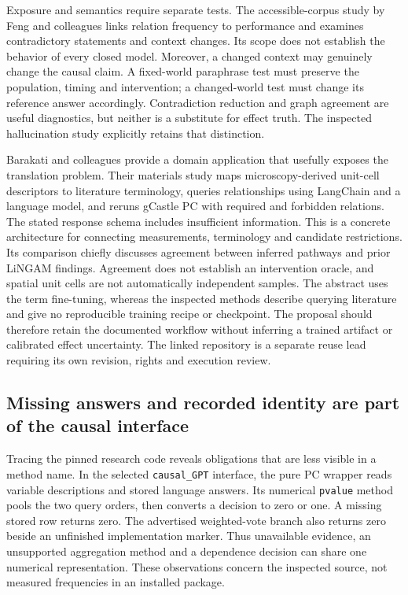 Exposure and semantics require separate tests. The accessible-corpus
study by Feng and colleagues links relation frequency to performance and
examines contradictory statements and context changes. Its scope does
not establish the behavior of every closed model. Moreover, a changed
context may genuinely change the causal claim. A fixed-world paraphrase
test must preserve the population, timing and intervention; a
changed-world test must change its reference answer accordingly.
\citep{v12_la_2407_19638} Contradiction reduction and graph agreement
are useful diagnostics, but neither is a substitute for effect truth.
The inspected hallucination study explicitly retains that distinction.
\citep{exec13_hallucination}

Barakati and colleagues provide a domain application that usefully
exposes the translation problem. Their materials study maps
microscopy-derived unit-cell descriptors to literature terminology,
queries relationships using LangChain and a language model, and reruns
gCastle PC with required and forbidden relations. The stated response
schema includes insufficient information. This is a concrete
architecture for connecting measurements, terminology and candidate
restrictions. Its comparison chiefly discusses agreement between
inferred pathways and prior LiNGAM findings. Agreement does not
establish an intervention oracle, and spatial unit cells are not
automatically independent samples. The abstract uses the term
fine-tuning, whereas the inspected methods describe querying literature
and give no reproducible training recipe or checkpoint. The proposal
should therefore retain the documented workflow without inferring a
trained artifact or calibrated effect uncertainty. The linked repository
is a separate reuse lead requiring its own revision, rights and
execution review. \citep{exec14_iid_materials}

\hypertarget{missing-answers-and-recorded-identity-are-part-of-the-causal-interface}{%
\subsection{Missing answers and recorded identity are part of the causal
interface}\label{missing-answers-and-recorded-identity-are-part-of-the-causal-interface}}

Tracing the pinned research code reveals obligations that are less
visible in a method name. In the selected \texttt{causal\_GPT}
interface, the pure PC wrapper reads variable descriptions and stored
language answers. Its numerical \texttt{pvalue} method pools the two
query orders, then converts a decision to zero or one. A missing stored
row returns zero. The advertised weighted-vote branch also returns zero
beside an unfinished implementation marker. Thus unavailable evidence,
an unsupported aggregation method and a dependence decision can share
one numerical representation. These observations concern the inspected
source, not measured frequencies in an installed package.
\citep{exec14_iid_gpt}

